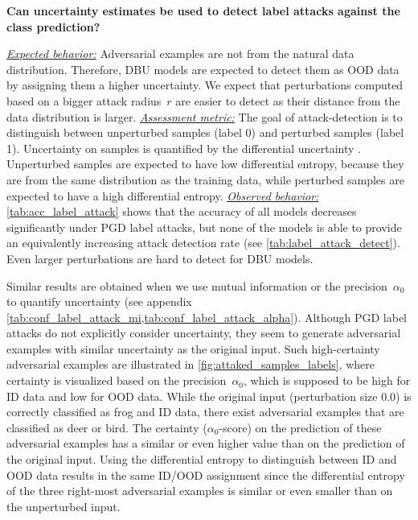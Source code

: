 \begin{center}
	\textbf{Can uncertainty estimates be used to detect label attacks against the class prediction?}	
\end{center}
\underline{\emph{Expected behavior:}} Adversarial examples are not from the natural data distribution. Therefore, DBU models are expected to detect them as OOD data by assigning them a higher uncertainty. We expect that perturbations computed based on a bigger attack radius~$r$ are easier to detect as their distance from the data distribution is larger. 
\underline{\emph{Assessment metric:}} The goal of attack-detection is to distinguish between unperturbed samples (label 0) and perturbed samples (label 1). Uncertainty on samples is quantified by the differential uncertainty \citep{malini2018}. Unperturbed samples are expected to have low differential entropy, because they are from the same distribution as the training data, while perturbed samples are expected to have a high differential entropy. 
\underline{\emph{Observed behavior:}} \cref{tab:acc_label_attack} shows that the accuracy of all models decreases significantly under PGD label attacks, but none of the models is able to provide an equivalently increasing attack detection rate (see \cref{tab:label_attack_detect}). Even larger perturbations are hard to detect for DBU models. 

Similar results are obtained when we use mutual information or the precision~$\alpha_0$ to quantify uncertainty (see appendix \cref{tab:conf_label_attack_mi,tab:conf_label_attack_alpha}).
Although PGD label attacks do not explicitly consider uncertainty, they seem to generate adversarial examples with similar uncertainty as the original input. 
Such high-certainty adversarial examples are illustrated in \cref{fig:attaked_samples_labels}, where certainty is visualized based on the precision~$\alpha_0$, which is supposed to be high for ID data and low for OOD data. While the original input (perturbation size $0.0$) is correctly classified as frog and ID data, there exist adversarial examples that are classified as deer or bird. The certainty ($\alpha_0$-score) on the prediction of these adversarial examples has a similar or even higher value than on the prediction of the original input. Using the differential entropy to distinguish between ID and OOD data results in the same ID/OOD assignment since the differential entropy of the three right-most adversarial examples is similar or even smaller than on the unperturbed input. 







